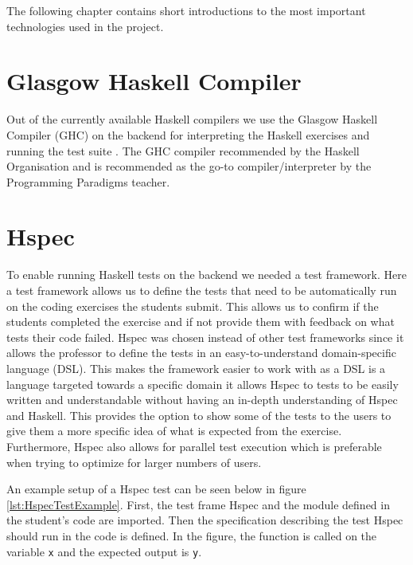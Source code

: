 The following chapter contains short introductions to the most important technologies used in the project. 

\section*{Glasgow Haskell Compiler} %
Out of the currently available Haskell compilers we use the Glasgow Haskell Compiler (GHC) on the backend for interpreting the Haskell exercises  and running the test suite . The GHC compiler recommended by the Haskell Organisation and is recommended as the go-to compiler/interpreter by the Programming Paradigms teacher.


\section*{Hspec}
To enable running Haskell tests on the backend we needed a test framework. Here a test framework allows us to define the tests that need to be automatically run on the coding exercises the students submit. This allows us to confirm if the students completed the exercise and if not provide them with feedback on what tests their code failed.
Hspec was chosen instead of other test frameworks since it allows the professor to define the tests in an easy-to-understand domain-specific language (DSL). 
This makes the framework easier to work with as a DSL is a language targeted towards a specific domain it allows Hspec to tests to be easily written and understandable without having an in-depth understanding of Hspec and Haskell. 
This provides the option to show some of the tests to the users to give them a more specific idea of what is expected from the exercise. 
Furthermore, Hspec also allows for parallel test execution which is preferable when trying to optimize for larger numbers of users.

An example setup of a Hspec test can be seen below in figure \ref{lst:HspecTestExample}. First, the test frame Hspec and the module defined in the student’s code are imported. Then the specification describing the test Hspec should run in the code is defined. In the figure, the function is called on the variable \texttt{x} and the expected output is \texttt{y}.

